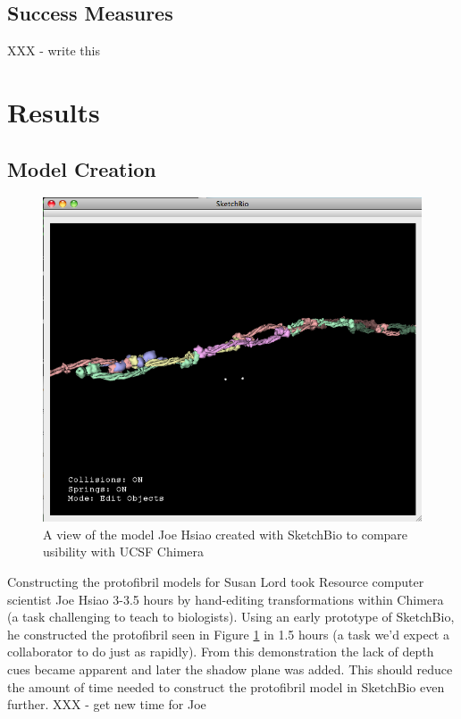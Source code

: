 \documentclass[twocolumn]{bmcart}%
\begin{document}

\subsection*{Success Measures}

XXX - write this

\section*{Results}
\subsection*{Model Creation}

\begin{figure}[h]
\centering
\includegraphics[width=0.8\columnwidth]{joe_test.png}
\caption{A view of the model Joe Hsiao created with SketchBio to compare usibility with UCSF Chimera}
\label{fig:joe_test}
\end{figure}

Constructing the protofibril models for Susan Lord took Resource computer scientist Joe Hsiao 3-3.5 hours by hand-editing transformations within Chimera (a task challenging to teach to biologists).  Using an early prototype of SketchBio, he constructed the protofibril seen in Figure \ref{fig:joe_test} in 1.5 hours (a task we'd expect a collaborator to do just as rapidly).  From this demonstration the lack of depth cues became apparent and later the shadow plane was added.  This should reduce the amount of time needed to construct the protofibril model in SketchBio even further.  XXX - get new time for Joe
\end{document}
